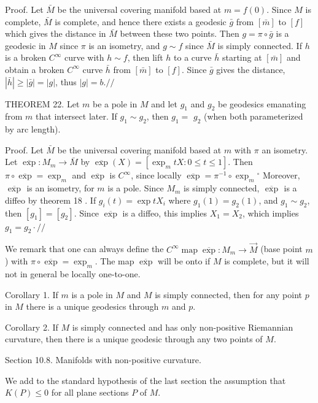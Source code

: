 \documentclass[10pt]{article}
\begin{document}
Proof. Let $\bar{M}$ be the universal covering manifold based at $m=f(0)$. Since $M$ is complete, $\bar{M}$ is complete, and hence there exists a geodesic $\bar{g}$ from $[\bar{m}]$ to $[f]$ which gives the distance in $\bar{M}$ between these two points. Then $g=\pi \circ \bar{g}$ is a geodesic in $M$ since $\pi$ is an isometry, and $g \sim f$ since $\bar{M}$ is simply connected. If $h$ is a broken $C^{\infty}$ curve with $h \sim f$, then lift $h$ to a curve $\bar{h}$ starting at $[\bar{m}]$ and obtain a broken $C^{\infty}$ curve $\bar{h}$ from $[\bar{m}]$ to $[f]$. Since $\bar{g}$ gives the distance, $|\bar{h}| \geq|\bar{g}|=|g|$, thus $|g|=b . / /$

THEOREM 22. Let $m$ be a pole in $M$ and let $g_{1}$ and $g_{2}$ be geodesics emanating from $m$ that intersect later. If $g_{1} \sim g_{2}$, then $g_{1}=$ $g_{2}$ (when both parameterized by arc length).

Proof. Let $\bar{M}$ be the universal covering manifold based at $m$ with $\pi$ an isometry. Let $\overline{\exp }: M_{m} \rightarrow \bar{M}$ by $\overline{\exp }(X)=\left[\exp _{m} t X: 0 \leq t \leq 1\right]$. Then $\pi \circ \overline{\exp }=\exp _{m}$ and $\overline{\exp }$ is $C^{\infty}$, since locally $\overline{\exp }=\pi^{-1} \circ \exp _{m}{ }^{\circ}$ Moreover, $\overline{\text { exp }}$ is an isometry, for $m$ is a pole. Since $M_{m}$ is simply connected, $\overline{\text { exp }}$ is a diffeo by theorem 18 . If $g_{i}(t)=\exp t X_{i}$ where $g_{1}(1)=g_{2}(1)$, and $g_{1} \sim g_{2}$, then $\left[g_{1}\right]=\left[g_{2}\right]$. Since $\overline{\exp }$ is a diffeo, this implies $X_{1}=X_{2}$, which implies $g_{1}=g_{2} \cdot / /$

We remark that one can always define the $C^{\infty} \operatorname{map} \overline{\exp }: M_{m} \rightarrow \vec{M}$ (base point $m$ ) with $\pi \circ \overline{\exp }=\exp _{m} .$ The map $\overline{\exp }$ will be onto if $M$ is complete, but it will not in general be locally one-to-one.

Corollary 1. If $m$ is a pole in $M$ and $M$ is simply connected, then for any point $p$ in $M$ there is a unique geodesics through $m$ and $p$.

Corollary 2. If $M$ is simply connected and has only non-positive Riemannian curvature, then there is a unique geodesic through any two points of $M$.

Section 10.8. Manifolds with non-positive curvature.

We add to the standard hypothesis of the last section the assumption that $K(P) \leq 0$ for all plane sections $P$ of $M$.
\end{document}
